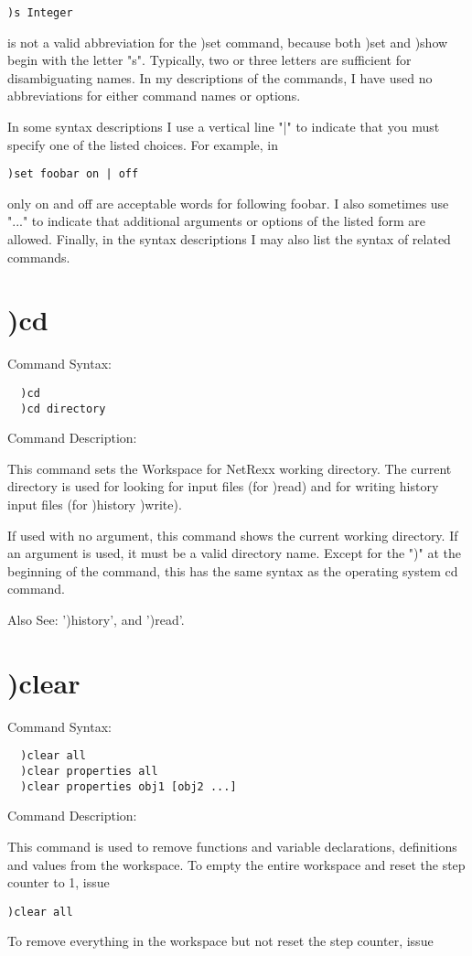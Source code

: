 \begin{verbatim}
)s Integer
\end{verbatim}
is not a valid abbreviation for the )set command, because both )set and )show begin with the letter "s". Typically, two or three letters are sufficient for disambiguating names. In my descriptions of the commands, I have used no abbreviations for either command names or options.

In some syntax descriptions I use a vertical line "|" to indicate that you must specify one of the listed choices. For example, in

\begin{verbatim}
)set foobar on | off
\end{verbatim}
only on and off are acceptable words for following foobar. I also sometimes use "..." to indicate that additional arguments or options of the listed form are allowed. Finally, in the syntax descriptions I may also list the syntax of related commands.

\section{)cd}

Command Syntax:
\begin{verbatim}
  )cd
  )cd directory
\end{verbatim}
Command Description:

This command sets the Workspace for NetRexx working directory. The current directory is used for looking for input files (for )read) and for writing history input files (for )history )write).

If used with no argument, this command shows the current working directory. If an argument is used, it must be a valid directory name. Except for the ")" at the beginning of the command, this has the same syntax as the operating system cd command.

Also See: ')history', and ')read'.

\section{)clear}

Command Syntax:
\begin{verbatim}
  )clear all
  )clear properties all
  )clear properties obj1 [obj2 ...]
\end{verbatim}
Command Description:

This command is used to remove functions and variable declarations, definitions and values from the workspace. To empty the entire workspace and reset the step counter to 1, issue
\begin{verbatim}
)clear all
\end{verbatim}
To remove everything in the workspace but not reset the step counter, issue

